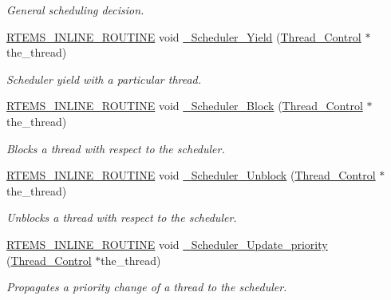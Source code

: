 \begin{DoxyCompactItemize}
\begin{DoxyCompactList}\small\item\em General scheduling decision. \end{DoxyCompactList}\item 
\mbox{\hyperlink{group__RTEMSScoreBaseDefs_gac216239df231d5dbd15e3520b0b9313f}{R\+T\+E\+M\+S\+\_\+\+I\+N\+L\+I\+N\+E\+\_\+\+R\+O\+U\+T\+I\+NE}} void \mbox{\hyperlink{group__RTEMSScoreScheduler_ga37b1082aa1832c4a73154d5fc92dceaa}{\+\_\+\+Scheduler\+\_\+\+Yield}} (\mbox{\hyperlink{struct__Thread__Control}{Thread\+\_\+\+Control}} $\ast$the\+\_\+thread)
\begin{DoxyCompactList}\small\item\em Scheduler yield with a particular thread. \end{DoxyCompactList}\item 
\mbox{\hyperlink{group__RTEMSScoreBaseDefs_gac216239df231d5dbd15e3520b0b9313f}{R\+T\+E\+M\+S\+\_\+\+I\+N\+L\+I\+N\+E\+\_\+\+R\+O\+U\+T\+I\+NE}} void \mbox{\hyperlink{group__RTEMSScoreScheduler_gad25705e24ba30f0cb36c0e2999fbfbce}{\+\_\+\+Scheduler\+\_\+\+Block}} (\mbox{\hyperlink{struct__Thread__Control}{Thread\+\_\+\+Control}} $\ast$the\+\_\+thread)
\begin{DoxyCompactList}\small\item\em Blocks a thread with respect to the scheduler. \end{DoxyCompactList}\item 
\mbox{\hyperlink{group__RTEMSScoreBaseDefs_gac216239df231d5dbd15e3520b0b9313f}{R\+T\+E\+M\+S\+\_\+\+I\+N\+L\+I\+N\+E\+\_\+\+R\+O\+U\+T\+I\+NE}} void \mbox{\hyperlink{group__RTEMSScoreScheduler_ga8289b090b6cb3c711ba614a047d4a343}{\+\_\+\+Scheduler\+\_\+\+Unblock}} (\mbox{\hyperlink{struct__Thread__Control}{Thread\+\_\+\+Control}} $\ast$the\+\_\+thread)
\begin{DoxyCompactList}\small\item\em Unblocks a thread with respect to the scheduler. \end{DoxyCompactList}\item 
\mbox{\hyperlink{group__RTEMSScoreBaseDefs_gac216239df231d5dbd15e3520b0b9313f}{R\+T\+E\+M\+S\+\_\+\+I\+N\+L\+I\+N\+E\+\_\+\+R\+O\+U\+T\+I\+NE}} void \mbox{\hyperlink{group__RTEMSScoreScheduler_ga7fdbd807dbde0152b93a9ebc59f69e5d}{\+\_\+\+Scheduler\+\_\+\+Update\+\_\+priority}} (\mbox{\hyperlink{struct__Thread__Control}{Thread\+\_\+\+Control}} $\ast$the\+\_\+thread)
\begin{DoxyCompactList}\small\item\em Propagates a priority change of a thread to the scheduler. \end{DoxyCompactList}\item 

\end{DoxyCompactItemize}

